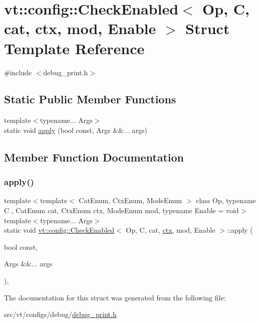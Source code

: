 \hypertarget{structvt_1_1config_1_1_check_enabled}{}\section{vt\+:\+:config\+:\+:Check\+Enabled$<$ Op, C, cat, ctx, mod, Enable $>$ Struct Template Reference}
\label{structvt_1_1config_1_1_check_enabled}


{\ttfamily \#include $<$debug\+\_\+print.\+h$>$}

\subsection*{Static Public Member Functions}
\begin{DoxyCompactItemize}
\item 
{\footnotesize template$<$typename... Args$>$ }\\static void \hyperlink{structvt_1_1config_1_1_check_enabled_a27257cc74520a9500c0b23bcf07b9e85}{apply} (bool const, Args \&\&... args)
\end{DoxyCompactItemize}


\subsection{Member Function Documentation}
\mbox{\label{structvt_1_1config_1_1_check_enabled_a27257cc74520a9500c0b23bcf07b9e85}} 
\subsubsection{\texorpdfstring{apply()}{apply()}}
{\footnotesize\ttfamily template$<$template$<$ Cat\+Enum, Ctx\+Enum, Mode\+Enum $>$ class Op, typename C , Cat\+Enum cat, Ctx\+Enum ctx, Mode\+Enum mod, typename Enable  = void$>$ \\
template$<$typename... Args$>$ \\
static void \hyperlink{structvt_1_1config_1_1_check_enabled}{vt\+::config\+::\+Check\+Enabled}$<$ Op, C, cat, \hyperlink{namespacevt_1_1config_a0551245b6b893932b95aaf8eac94eed1}{ctx}, mod, Enable $>$\+::apply (\begin{DoxyParamCaption}\item[{bool}]{const,  }\item[{Args \&\&...}]{args }\end{DoxyParamCaption})\hspace{0.3cm}{\ttfamily [inline]}, {\ttfamily [static]}}



The documentation for this struct was generated from the following file\+:\begin{DoxyCompactItemize}
\item 
src/vt/configs/debug/\hyperlink{debug__print_8h}{debug\+\_\+print.\+h}\end{DoxyCompactItemize}
